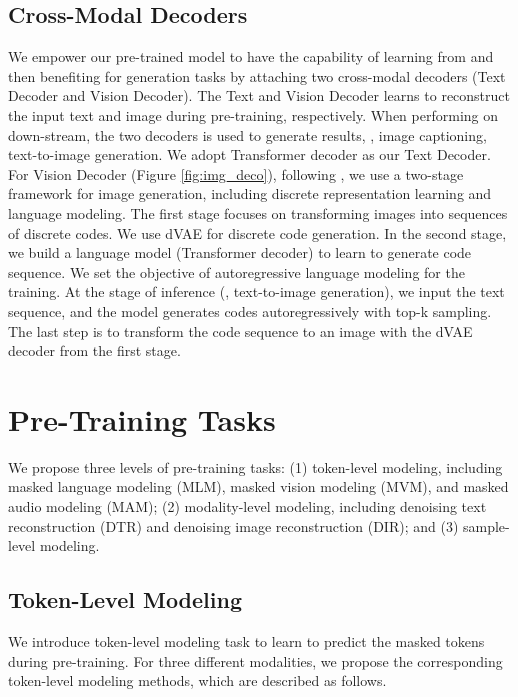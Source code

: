 \documentclass[10pt,twocolumn,letterpaper]{article}
\begin{document}
\subsection{Cross-Modal Decoders}  \label{sec:dec}
We empower our pre-trained model to have the capability of learning from and then benefiting for generation tasks by attaching two cross-modal decoders (\ie Text Decoder and Vision Decoder). The Text and Vision Decoder learns to reconstruct the input text and image during pre-training, respectively. When performing on down-stream, the two decoders is used to generate results, \eg, image captioning, text-to-image generation. We adopt Transformer decoder \cite{vaswani2017attention} as our Text Decoder. For Vision Decoder (Figure \ref{fig:img_deco}), following \cite{dalle}, we use a two-stage framework for image generation, including discrete representation learning and language modeling. The first stage focuses on transforming images into sequences of discrete codes. We use dVAE \cite{dalle} for discrete code generation. In the second stage, we build a language model (\ie Transformer decoder) to learn to generate code sequence. We set the objective of autoregressive language modeling for the training. At the stage of inference (\eg, text-to-image generation), we input the text sequence, and the model generates codes autoregressively with top-k sampling. The last step is to transform the code sequence to an image with the dVAE decoder from the first stage.

\section{Pre-Training Tasks}
We propose three levels of pre-training tasks: (1) token-level modeling, including masked language modeling (MLM), masked vision modeling (MVM), and masked audio modeling (MAM); (2) modality-level modeling, including denoising text reconstruction (DTR) and denoising image reconstruction (DIR); and (3) sample-level modeling.

\subsection{Token-Level Modeling}
We introduce token-level modeling task to learn to predict the masked tokens during pre-training. For three different modalities, we propose the corresponding token-level modeling methods, which are described as follows. \\
\end{document}
